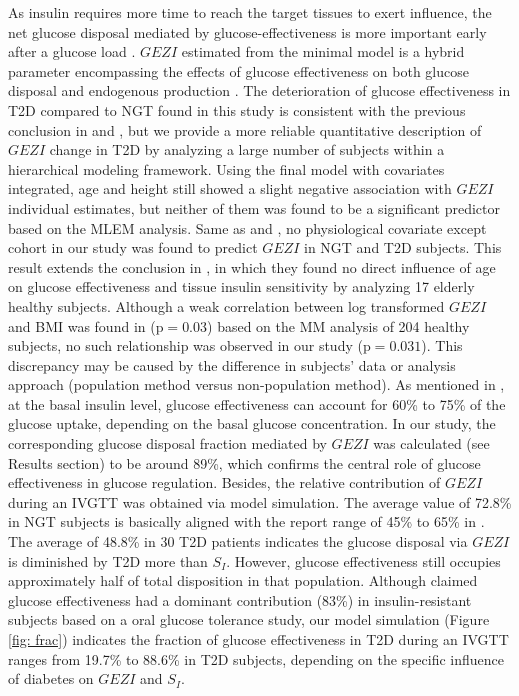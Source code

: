 \documentclass[utf8]{frontiersSCNS} %
\begin{document}
As insulin requires more time to reach the target tissues to exert influence, the net glucose disposal mediated by glucose-effectiveness is more important early after a glucose load \citep{Best1996}. $GEZI$ estimated from the minimal model is a hybrid parameter encompassing the effects of glucose effectiveness on both glucose disposal and endogenous production \citep{Vicini1999}. The deterioration of glucose effectiveness in T2D compared to NGT found in this study is consistent with the previous conclusion in \citet{welch_1990} and \citet{ataru_1992}, but we provide a more reliable quantitative description of $GEZI$ change in T2D by analyzing a large number of subjects within a hierarchical modeling framework. Using the final model with covariates integrated, age and height still showed a slight negative association with $GEZI$ individual estimates, but neither of them was found to be a significant predictor based on the MLEM analysis. Same as \citet{Denti2010} and \citet{hoffman_2000}, no physiological covariate except cohort in our study was found to predict $GEZI$ in NGT and T2D subjects. This result extends the conclusion in \citet{pacini_1998}, in which they found no direct influence of age on glucose effectiveness and tissue insulin sensitivity by analyzing 17 elderly healthy subjects. Although a weak correlation between log transformed $GEZI$ and BMI was found in \citet{SG_compo} (p$=0.03$) based on the MM analysis of 204 healthy subjects, no such relationship was observed in our study (p$=0.031$). This discrepancy may be caused by the difference in subjects' data or analysis approach (population method versus non-population method). As mentioned in \citet{Best1996}, at the basal insulin level, glucose effectiveness can account for 60\% to 75\% of the glucose uptake, depending on the basal glucose concentration. In our study, the corresponding glucose disposal fraction mediated by $GEZI$ was calculated (see Results section) to be around 89\%, which confirms the central role of glucose effectiveness in glucose regulation. Besides, the relative contribution of $GEZI$ during an IVGTT was obtained via model simulation. The average value of 72.8\% in NGT subjects is basically aligned with the report range of 45\% to 65\% in \citet{Alford_2018}. The average of 48.8\% in 30 T2D patients indicates the glucose disposal via $GEZI$ is diminished by T2D more than $S_I$. However, glucose effectiveness still occupies approximately half of total disposition in that population. Although \citet{Best1996} claimed glucose effectiveness had a dominant contribution (83\%) in insulin-resistant subjects based on a oral glucose tolerance study, our model simulation (Figure \ref{fig: frac}) indicates the fraction of glucose effectiveness in T2D during an IVGTT ranges from 19.7\% to 88.6\% in T2D subjects, depending on the specific influence of diabetes on $GEZI$ and $S_I$.  
\end{document}
